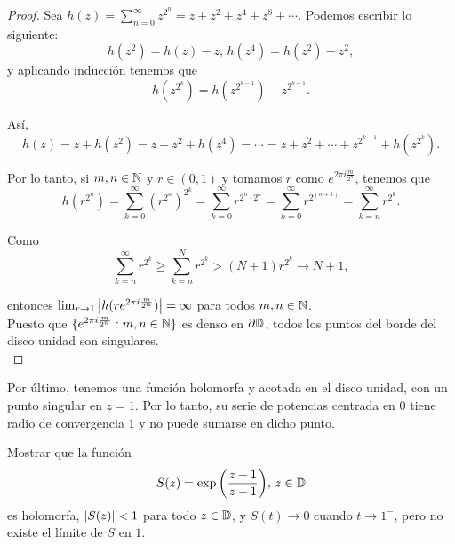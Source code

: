 \begin{proof}
     Sea $h(z) = \sum_{n=0}^{\infty} z^{2^n} = z + z^2 + z^4 + z^8 + \cdots$. Podemos escribir lo siguiente:
    \begin{equation*}
         h(z^2) = h(z) - z, \,
         h(z^4) = h(z^2) - z^2,
    \end{equation*}
    y aplicando inducción tenemos que
    \begin{equation*}
        h(z^{2^k}) = h(z^{2^{k-1}}) - z^{2^{k-1}}.
    \end{equation*}

    Así,
    \begin{equation*}
        h(z) = z + h(z^2) = z + z^2 + h(z^4) = \cdots = z + z^2 + \cdots + z^{2^{k-1}} + h(z^{2^k}).
    \end{equation*}

    Por lo tanto, si $m, n \in \mathbb{N}$ y $r \in (0,1)$ y tomamos $r$ como $e^{2 \pi i \frac{m}{2^n}}$, tenemos que
    \begin{equation*}
        h(r^{2^n}) = \sum_{k=0}^{\infty} (r^{2^n})^{2^k} = \sum_{k=0}^{\infty} r^{2^n \cdot 2^k} = \sum_{k=0}^{\infty} r^{2^{(n+k)}} =  \sum_{k=n}^{\infty} r^{2^k}.
    \end{equation*}

    Como
    \begin{equation*}
        \sum_{k=n}^{\infty} r^{2^k} \geq \sum_{k=n}^{N} r^{2^k} > (N + 1) r^{2^k} \to N + 1,
    \end{equation*}

    entonces $\lim_{r\to 1} \left\lvert h(re^{2 \pi i \frac{m}{2^n}})\right\rvert = \infty$ para todos $m, n \in \mathbb{N}$. \\

    Puesto que $\{e^{2 \pi i \frac{m}{2^n}} : m, n \in \mathbb{N}\}$ es denso en $\partial \mathbb{D}$, todos los puntos del borde del disco unidad son singulares. \\
\end{proof}


Por último, tenemos una función holomorfa y acotada en el disco unidad, con un punto singular en $z = 1$. Por lo tanto, su serie de potencias centrada en $0$ tiene radio de convergencia $1$ y no puede sumarse en dicho punto. \\

\begin{example}
    \label{ex:exp}
    Mostrar que la función
    \begin{equation*}
        S(z) = \exp{\left(\frac{z + 1}{z - 1}\right)}, \, z \in \mathbb{D}
    \end{equation*}
    es holomorfa, $\left\lvert S(z)\right\rvert < 1$ para todo $z \in \mathbb{D}$, y $S(t)\to 0$ cuando $t \to 1^-$, pero no existe el límite de $S$ en $1$.
\end{example}

